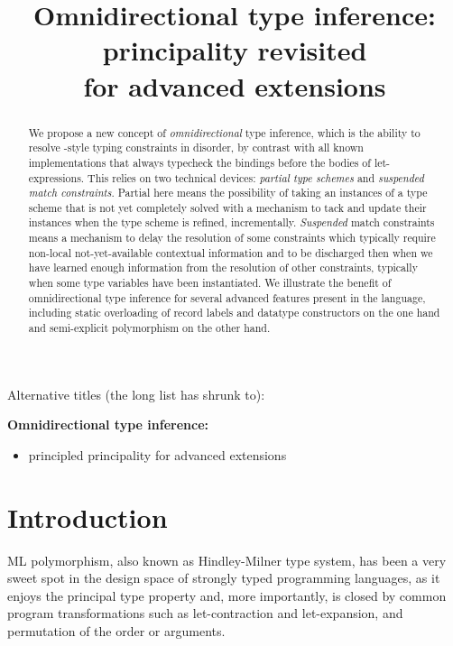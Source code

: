 \documentclass[acmsmall,screen,nonacm]{acmart}
\title{Omnidirectional type inference:
   principality revisited \\ for advanced \ML extensions
}
\begin{document}
\begin{abstract}
We propose a new concept of \emph{omnidirectional} type inference, which is
the ability to resolve \ML-style typing constraints in disorder, by
contrast with all known implementations that always typecheck the
bindings before the bodies of let-expressions.
%
This relies on two technical devices: \emph{partial type schemes}
and \emph{suspended match constraints}. Partial here means  the
possibility of taking an instances of a type scheme that is not yet
completely solved with a mechanism to tack and update their instances when
the type scheme is refined, incrementally.
\emph{Suspended} match constraints means a mechanism to delay the resolution of
some constraints which typically require non-local not-yet-available
contextual information and to be discharged then when we have learned enough
information from the resolution of other constraints, typically when some type
variables have been instantiated.
%
We illustrate the benefit of omnidirectional type inference for several
advanced features present in the \OCaml language, including static
overloading of record labels and datatype constructors on the one hand and
semi-explicit polymorphism on the other hand.
\end{abstract}

\maketitle

\begin{version}[Titles]{\blue\True}
Alternative titles (the long list has shrunk to):

\medskip
\noindent \textbf{Omnidirectional type inference:}
\begin{itemize}
\item principled principality for advanced \ML extensions
\end{itemize}

\end{version}

\section{Introduction}

ML polymorphism, also known as Hindley-Milner type system, has been a very
sweet spot in the design space of strongly typed programming languages, as
it enjoys the principal type property and, more importantly, is closed by
common program transformations such as let-contraction and let-expansion,
and permutation of the order or arguments.
\end{document}
